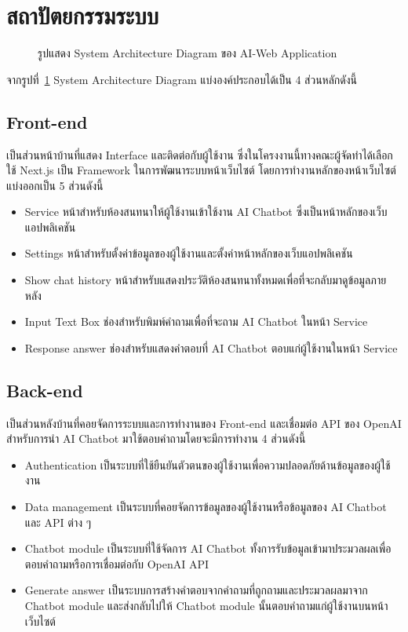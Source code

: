 \documentclass[12pt,oneside,openright,a4paper]{cpe-thai-project}
\begin{document}
\section{สถาปัตยกรรมระบบ}
\begin{figure}[!h]\centering
\setlength{\fboxrule}{0.1mm}
\caption{รูปแสดง System Architecture Diagram ของ AI-Web Application}\label{fig:F3.17}
\end{figure}
จากรูปที่~\ref{fig:F3.17} System Architecture Diagram แบ่งองค์ประกอบได้เป็น 4 ส่วนหลักดังนี้
\subsection{Front-end}
เป็นส่วนหน้าบ้านที่แสดง Interface และติดต่อกับผู้ใช้งาน ซึ่งในโครงงานนี้ทางคณะผู้จัดทำได้เลือกใช้ Next.js เป็น Framework ในการพัฒนาระบบหน้าเว็บไซต์ โดยการทำงานหลักของหน้าเว็บไซต์แบ่งออกเป็น 5 ส่วนดังนี้
\begin{itemize}
\item Service หน้าสำหรับห้องสนทนาให้ผู้ใช้งานเข้าใช้งาน AI Chatbot ซึ่งเป็นหน้าหลักของเว็บแอปพลิเคชัน
\item Settings หน้าสำหรับตั้งค่าข้อมูลของผู้ใช้งานและตั้งค่าหน้าหลักของเว็บแอปพลิเคชัน
\item Show chat history หน้าสำหรับแสดงประวัติห้องสนทนาทั้งหมดเพื่อที่จะกลับมาดูข้อมูลภายหลัง
\item Input Text Box ช่องสำหรับพิมพ์คำถามเพื่อที่จะถาม AI Chatbot ในหน้า Service
\item Response answer ช่องสำหรับแสดงคำตอบที่ AI Chatbot ตอบแก่ผู้ใช้งานในหน้า Service
\end{itemize}

\subsection{Back-end}
เป็นส่วนหลังบ้านที่คอยจัดการระบบและการทำงานของ Front-end และเชื่อมต่อ API ของ OpenAI สำหรับการนำ AI Chatbot มาใช้ตอบคำถามโดยจะมีการทำงาน 4 ส่วนดังนี้
\begin{itemize}
\item Authentication เป็นระบบที่ใช้ยืนยันตัวตนของผู้ใช้งานเพื่อความปลอดภัยด้านข้อมูลของผู้ใช้งาน
\item Data management เป็นระบบที่คอยจัดการข้อมูลของผู้ใช้งานหรือข้อมูลของ AI Chatbot และ API ต่าง ๆ
\item Chatbot module เป็นระบบที่ใช้จัดการ AI Chatbot ทั้งการรับข้อมูลเข้ามาประมวลผลเพื่อตอบคำถามหรือการเชื่อมต่อกับ OpenAI API 
\item Generate answer เป็นระบบการสร้างคำตอบจากคำถามที่ถูกถามและประมวลผลมาจาก Chatbot module และส่งกลับไปให้ Chatbot module นั้นตอบคำถามแก่ผู้ใช้งานบนหน้าเว็บไซต์
\end{itemize}
\end{document}
